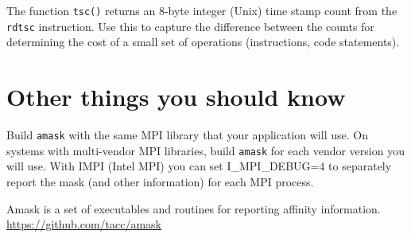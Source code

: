 \documentclass[10pt,a4paper]{report}
\begin{document}
The function \verb+tsc()+ returns an 8-byte integer (Unix) time stamp count from
the \verb+rdtsc+ instruction. Use this to capture the difference between the counts for
determining 
the cost of a small set of operations (instructions, code statements). 



\section{Other things you should know}
Build \verb+amask+ with the same MPI library that your 
application will use.  On systems with multi-vendor MPI libraries,
build \verb+amask+ for each vendor version you will use.
With IMPI (Intel MPI) you can set I\_MPI\_DEBUG=4 to
separately report the mask (and other information) for each MPI process. 


\FloatBarrier
{}
\begin{thebibliography}{00}


 Amask is a set of executables and routines for reporting affinity information. \href{https://github.com/tacc/amask}{https://github.com/tacc/amask}


\end{thebibliography}
\end{document}
